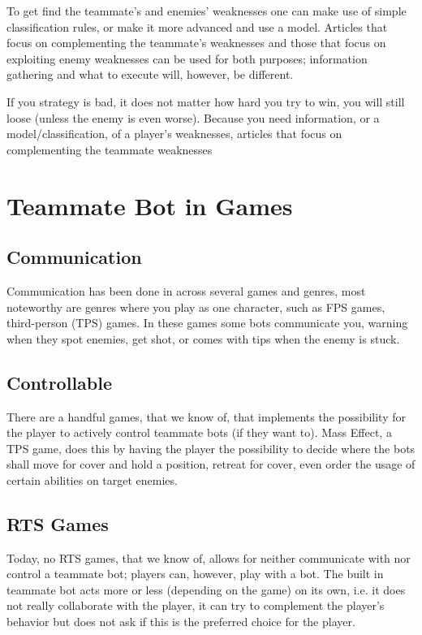 To get find the teammate’s and enemies’ weaknesses one can make use of simple classification rules, or make it more advanced and use a model. Articles that focus on complementing the teammate’s weaknesses\cite{jansen07, pucheng11,houlette03} and those that focus on exploiting enemy weaknesses\cite{kabanza10, schadd07, synnaeve11} can be used for both purposes; information gathering and what to execute will, however, be different.

If you strategy is bad, it does not matter how hard you try to win, you will still loose (unless the enemy is even worse). Because you need information, or a model/classification, of a player’s weaknesses, articles that focus on complementing the teammate weaknesses

\section{Teammate Bot in Games}



\subsection{Communication}
\label{sec:games_communication}
Communication has been done in across several games and genres, most noteworthy are genres where you play as one character, such as FPS games, third-person (TPS) games. In these games some bots communicate you, warning when they spot enemies, get shot, or comes with tips when the enemy is stuck. 



\subsection{Controllable}
There are a handful games, that we know of, that implements the possibility for the player to actively control teammate bots (if they want to). Mass Effect\cite{masseffect}, a TPS game, does this by having the player the possibility to decide where the bots shall move for cover and hold a position, retreat for cover, even order the usage of certain abilities on target enemies.


\subsection{RTS Games}
Today, no RTS games, that we know of, allows for neither communicate with nor control a teammate bot; players can, however, play with a bot. The built in teammate bot acts more or less (depending on the game) on its own, i.e. it does not really collaborate with the player, it can try to complement the player's behavior but does not ask if this is the preferred choice for the player.

